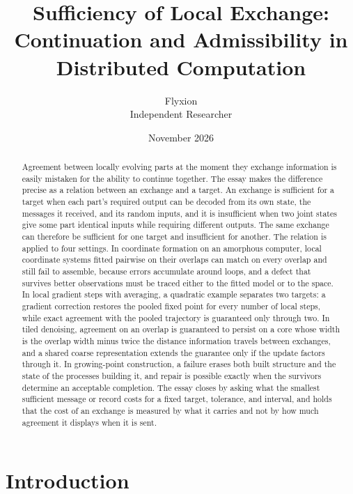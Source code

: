 \documentclass[11pt]{article}
\title{Sufficiency of Local Exchange:\\
Continuation and Admissibility in Distributed Computation}
\author{Flyxion\\Independent Researcher}
\date{November 2026}
\theoremstyle{definition}
\theoremstyle{plain}
\theoremstyle{remark}
\begin{document}
\maketitle

\begin{abstract}
\noindent Agreement between locally evolving parts at the moment they exchange information is easily mistaken for the ability to continue together. The essay makes the difference precise as a relation between an exchange and a target. An exchange is sufficient for a target when each part's required output can be decoded from its own state, the messages it received, and its random inputs, and it is insufficient when two joint states give some part identical inputs while requiring different outputs. The same exchange can therefore be sufficient for one target and insufficient for another. The relation is applied to four settings. In coordinate formation on an amorphous computer, local coordinate systems fitted pairwise on their overlaps can match on every overlap and still fail to assemble, because errors accumulate around loops, and a defect that survives better observations must be traced either to the fitted model or to the space. In local gradient steps with averaging, a quadratic example separates two targets: a gradient correction restores the pooled fixed point for every number of local steps, while exact agreement with the pooled trajectory is guaranteed only through two. In tiled denoising, agreement on an overlap is guaranteed to persist on a core whose width is the overlap width minus twice the distance information travels between exchanges, and a shared coarse representation extends the guarantee only if the update factors through it. In growing-point construction, a failure erases both built structure and the state of the processes building it, and repair is possible exactly when the survivors determine an acceptable completion. The essay closes by asking what the smallest sufficient message or record costs for a fixed target, tolerance, and interval, and holds that the cost of an exchange is measured by what it carries and not by how much agreement it displays when it is sent.
\end{abstract}

\newpage

\section*{Introduction}
\end{document}
